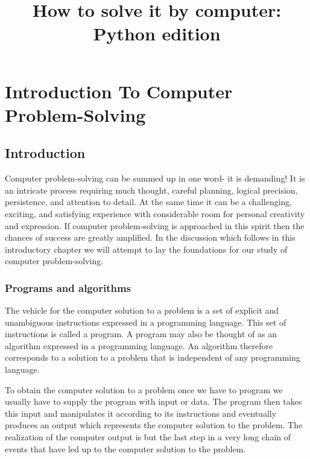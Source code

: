 \documentclass{book}
\begin{document}
\title{How to solve it by computer: Python edition}
\maketitle

\chapter{Introduction To Computer Problem-Solving}
\section{Introduction}
Computer problem-solving can be summed up in one word- it is demanding! It is an intricate process requiring much thought, careful planning, logical precision, persistence, and attention to detail. At the same time it can be a challenging, exciting, and satisfying experience with considerable room for personal creativity and expression. If computer problem-solving is approached in this spirit then the chances of success are greatly amplified. In the discussion which follows in this introductory chapter we will attempt to lay the foundations for our study of computer problem-solving.
\subsection{Programs and algorithms}
The vehicle for the computer solution to a problem is a set of explicit and unambiguous instructions expressed in a programming language. This set of instructions is called a program. A program may also be thought of as an algorithm expressed in a programming language. An algorithm therefore corresponds to a solution to a problem that is independent of any programming language.\par
	To obtain the computer solution to a problem once we have to program we usually have to supply the program with input or data. The program then takes this input and manipulates it according to its instructions and eventually produces an output which represents the computer solution to the problem. The realization of the computer output is but the last step in a very long chain of events that have led up to the computer solution to the problem.\par
\end{document}
